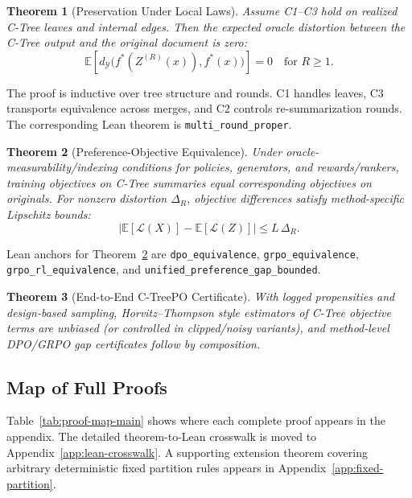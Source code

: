 \documentclass[11pt]{article}
\newtheorem{theorem}{Theorem}
\newcommand{\E}{\mathbb{E}}
\newcommand{\Y}{\mathcal{Y}}
\newcommand{\metric}{d_{\Y}}
\newcommand{\fstar}{f^\ast}
\begin{document}
\begin{theorem}[Preservation Under Local Laws]\label{thm:preservation}
Assume C1--C3 hold on realized C-Tree leaves and internal edges.
Then the expected oracle distortion between the C-Tree output and the original document is zero:
\[
\E\left[\metric\big(\fstar(Z^{(R)}(x)),\fstar(x)\big)\right]=0\quad\text{for }R\ge1.
\]
\end{theorem}

The proof is inductive over tree structure and rounds. C1 handles leaves, C3 transports equivalence across merges, and C2 controls re-summarization rounds. The corresponding Lean theorem is \texttt{multi\_round\_proper}.

\begin{theorem}[Preference-Objective Equivalence]\label{thm:equiv}
Under oracle-measurability/indexing conditions for policies, generators, and rewards/rankers,
training objectives on C-Tree summaries equal corresponding objectives on originals.
For nonzero distortion $\Delta_R$, objective differences satisfy method-specific Lipschitz bounds:
\[
\left|\E[\mathcal{L}(X)]-\E[\mathcal{L}(Z)]\right| \le L\,\Delta_R.
\]
\end{theorem}

Lean anchors for Theorem~\ref{thm:equiv} are \texttt{dpo\_equivalence}, \texttt{grpo\_equivalence}, \texttt{grpo\_rl\_equivalence}, and \texttt{unified\_preference\_gap\_bounded}.

\begin{theorem}[End-to-End C-TreePO Certificate]\label{thm:e2e}
With logged propensities and design-based sampling,
Horvitz--Thompson style estimators of C-Tree objective terms are unbiased (or controlled in clipped/noisy variants),
and method-level DPO/GRPO gap certificates follow by composition.
\end{theorem}

\subsection{Map of Full Proofs}

Table~\ref{tab:proof-map-main} shows where each complete proof appears in the appendix.
The detailed theorem-to-Lean crosswalk is moved to Appendix~\ref{app:lean-crosswalk}.
A supporting extension theorem covering arbitrary deterministic fixed partition rules appears in Appendix~\ref{app:fixed-partition}.
\end{document}
